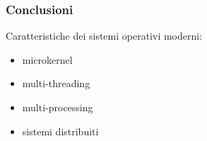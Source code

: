 \documentclass{beamer}
\begin{document}
	
	\begin{frame}
		\frametitle{Conclusioni}
		
		Caratteristiche dei sistemi operativi moderni:
		
		\begin{itemize}
			\item microkernel
			\item multi-threading
			\item multi-processing
			\item sistemi distribuiti
		\end{itemize}
		
	\end{frame}
	
\end{document}
